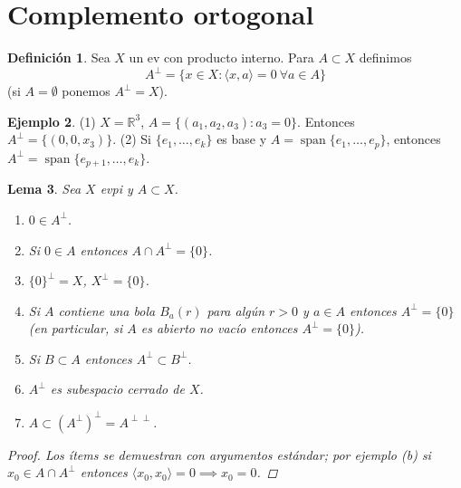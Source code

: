 \documentclass[11pt]{article}
\theoremstyle{definition}
\newtheorem{definition}{Definición}[section]
\newtheorem{example}[definition]{Ejemplo}
\theoremstyle{plain}
\newtheorem{lemma}[definition]{Lema}
\begin{document}
\section*{Complemento ortogonal}

\begin{definition}
Sea $X$ un ev con producto interno. Para $A\subset X$ definimos
$$A^{\perp}=\{x\in X:\langle x,a\rangle=0\ \forall a\in A\}$$
(si $A=\emptyset$ ponemos $A^{\perp}=X$).
\end{definition}

\begin{example}
(1) $X=\mathbb{R}^3$, $A=\{(a_1,a_2,a_3):a_3=0\}$. Entonces $A^{\perp}=\{(0,0,x_3)\}$. 
(2) Si $\{e_1,\dots,e_k\}$ es base y $A=\operatorname{span}\{e_1,\dots,e_p\}$, entonces $A^{\perp}=\operatorname{span}\{e_{p+1},\dots,e_k\}$.
\end{example}

\begin{lemma}
Sea $X$ evpi y $A\subset X$.
\begin{enumerate}[label=\alph*)]
\item $0\in A^{\perp}$.
\item Si $0\in A$ entonces $A\cap A^{\perp}=\{0\}$.
\item $\{0\}^{\perp}=X$, $X^{\perp}=\{0\}$.
\item Si $A$ contiene una bola $B_a(r)$ para algún $r>0$ y $a\in A$ entonces $A^{\perp}=\{0\}$ (en particular, si $A$ es abierto no vacío entonces $A^{\perp}=\{0\}$).
\item Si $B\subset A$ entonces $A^{\perp}\subset B^{\perp}$.
\item $A^{\perp}$ es subespacio cerrado de $X$.
\item $A\subset(A^{\perp})^{\perp}=A^{\perp\perp}$.
\end{enumerate}
\begin{proof}
Los ítems se demuestran con argumentos estándar; por ejemplo (b) si $x_0\in A\cap A^{\perp}$ entonces $\langle x_0,x_0\rangle=0\implies x_0=0$.
\end{proof}
\end{lemma}
\end{document}
